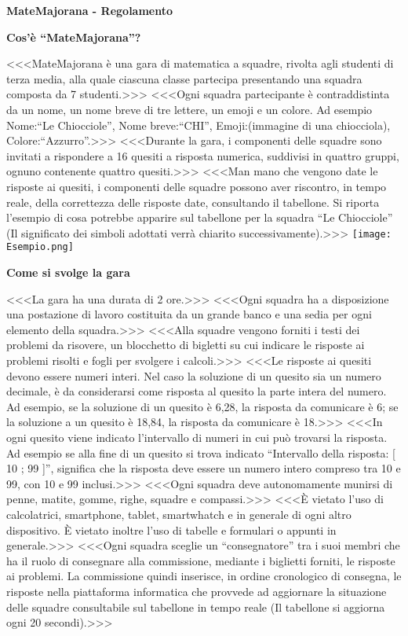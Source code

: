 \documentclass[12pt]{mcquiz}
\def\-#1{\qst <<<#1>>>}
\def\sec#1{\par{\bf\large#1}\par}
\def\tit#1{\par\begin{center}\bf\Large#1\end{center}\par}
\begin{document}
\tit{MateMajorana - Regolamento}
\sec{Cos'è ``MateMajorana''?}
\-{MateMajorana è una gara di matematica a squadre, rivolta agli studenti di terza media, alla quale ciascuna classe partecipa presentando una squadra composta da 7 studenti.}
\-{Ogni squadra partecipante è contraddistinta da un nome, un nome breve di tre lettere, un emoji e un colore. Ad esempio Nome:``Le Chiocciole'', Nome breve:``CHI'', Emoji:(immagine di una chiocciola), Colore:``Azzurro''.}
\-{Durante la gara, i componenti delle squadre sono invitati a rispondere a 16 quesiti a risposta numerica, suddivisi in quattro gruppi, ognuno contenente quattro quesiti.}
\-{Man mano che vengono date le risposte ai quesiti, i componenti delle squadre possono aver riscontro, in tempo reale, della correttezza delle risposte date, consultando il tabellone. Si riporta l'esempio di cosa potrebbe apparire sul tabellone per la squadra ``Le Chiocciole'' (Il significato dei simboli adottati verrà chiarito successivamente).}
\texttt{[image: Esempio.png]}
\sec{Come si svolge la gara}
\-{La gara ha una durata di 2 ore.}
\-{Ogni squadra ha a disposizione una postazione di lavoro costituita da un grande banco e una sedia per ogni elemento della squadra.}
\-{Alla squadre vengono forniti i testi dei problemi da risovere, un blocchetto di bigletti su cui indicare le risposte ai problemi risolti e fogli per svolgere i calcoli.}
\-{Le risposte ai quesiti devono essere numeri interi. Nel caso la soluzione di un quesito sia un numero decimale, è da considerarsi come risposta al quesito la parte intera del numero. Ad esempio, se la soluzione di un quesito è 6,28, la risposta da comunicare è 6; se la soluzione a un quesito è 18,84, la risposta da comunicare è 18.}
\-{In ogni quesito viene indicato l'intervallo di numeri in cui può trovarsi la risposta. Ad esempio se alla fine di un quesito si trova indicato ``Intervallo della risposta: [ 10 ; 99 ]'', significa che la risposta deve essere un numero intero compreso tra 10 e 99, con 10 e 99 inclusi.}
\-{Ogni squadra deve autonomamente munirsi di penne, matite, gomme, righe, squadre e compassi.}
\-{\`E vietato l'uso di calcolatrici, smartphone, tablet, smartwhatch e in generale di ogni altro dispositivo. \`E vietato inoltre l'uso di tabelle e formulari o appunti in generale.}
\-{Ogni squadra sceglie un ``consegnatore'' tra i suoi membri che ha il ruolo di consegnare alla commissione, mediante i biglietti forniti, le risposte ai problemi. La commissione quindi inserisce, in ordine cronologico di consegna, le risposte nella piattaforma informatica che provvede ad aggiornare la situazione delle squadre consultabile sul tabellone in tempo reale (Il tabellone si aggiorna ogni 20 secondi).}
\end{document}
